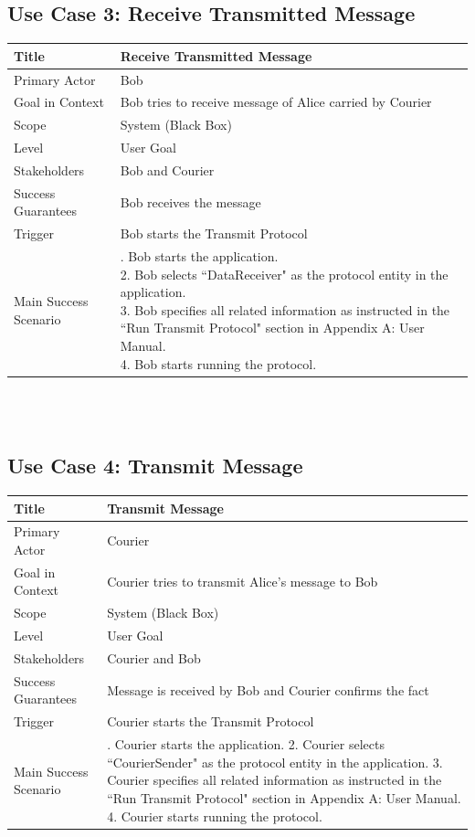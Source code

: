 \subsection*{Use Case 3: Receive Transmitted Message} 
\begin{tabular}{|l|p{}|}
 \hline
 Title & Receive Transmitted Message \\ \hline
 Primary Actor & Bob \\ \hline
 Goal in Context & Bob tries to receive message of Alice carried by Courier \\ \hline
 Scope & System (Black Box) \\ \hline
 Level & User Goal \\ \hline
 Stakeholders & Bob and Courier \\ \hline
 Success Guarantees & Bob receives the message \\ \hline
 Trigger & Bob starts the Transmit Protocol \\ \hline
 Main Success Scenario & 
 \parbox{9cm}{
  . Bob starts the application. \\
  2. Bob selects ``DataReceiver" as the protocol entity in the application. \\
  3. Bob specifies all related information as instructed in the ``Run Transmit Protocol" section in Appendix A: User Manual. \\
  4. Bob starts running the protocol.
  \medskip
 }
 \\ \hline
\end{tabular}
\\ 
\\
\subsection*{Use Case 4: Transmit Message}
\begin{tabular}{|l|p{}|}
 \hline
 Title & Transmit Message \\ \hline
 Primary Actor & Courier \\ \hline
 Goal in Context & Courier tries to transmit Alice's message to Bob \\ \hline
 Scope & System (Black Box) \\ \hline
 Level & User Goal \\ \hline
 Stakeholders & Courier and Bob\\ \hline
 Success Guarantees & Message is received by Bob and Courier confirms the fact \\ \hline
 Trigger & Courier starts the Transmit Protocol \\ \hline
 Main Success Scenario & 
 \parbox{9cm}{
  . Courier starts the application.
  2. Courier selects ``CourierSender" as the protocol entity in the application.
  3. Courier specifies all related information as instructed in the ``Run Transmit Protocol" section in Appendix A: User Manual.
  4. Courier starts running the protocol.
  \medskip
 }
 \\ \hline
\end{tabular}
\\

